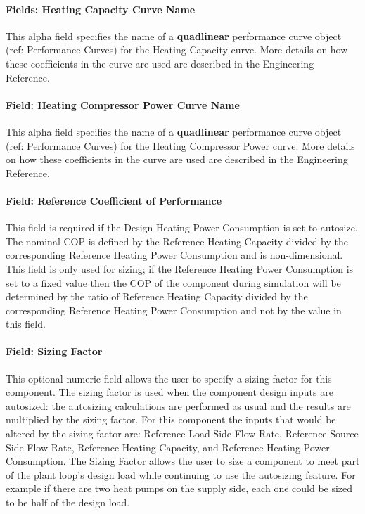\paragraph{Fields: Heating Capacity Curve Name}\label{fields-heating-capacity-curve-name}

This alpha field specifies the name of a \textbf{quadlinear} performance curve object (ref: Performance Curves) for the Heating Capacity curve. More details on how these coefficients in the curve are used are described in the Engineering Reference.

\paragraph{Field: Heating Compressor Power Curve Name}\label{field-heating-compressor-power-curve-name}

This alpha field specifies the name of a \textbf{quadlinear} performance curve object (ref: Performance Curves) for the Heating Compressor Power curve. More details on how these coefficients in the curve are used are described in the Engineering Reference.

\paragraph{Field: Reference Coefficient of Performance}\label{field-heating-nom-COP}

This field is required if the Design Heating Power Consumption is set to autosize. The nominal COP is defined by the Reference Heating Capacity divided by the corresponding Reference Heating Power Consumption and is non-dimensional. This field is only used for sizing; if the Reference Heating Power Consumption is set to a fixed value then the COP of the component during simulation will be determined by the ratio of Reference Heating Capacity divided by the corresponding Reference Heating Power Consumption and not by the value in this field.

\paragraph{Field: Sizing Factor}\label{field-heating-siz-fac}

This optional numeric field allows the user to specify a sizing factor for this component. The
sizing factor is used when the component design inputs are autosized: the autosizing calculations
are performed as usual and the results are multiplied by the sizing factor. For this component
the inputs that would be altered by the sizing factor are: Reference Load Side Flow Rate, Reference Source Side Flow Rate, Reference Heating Capacity, and Reference Heating Power Consumption. The Sizing Factor allows the user to size
a component to meet part of the plant loop's design load while continuing to use the autosizing feature. For example if there are two heat pumps on the supply side, each one could be sized to be half of the design load.

